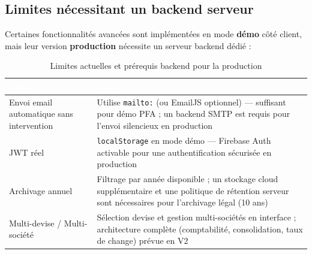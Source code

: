 \documentclass[12pt,a4paper]{report}
\begin{document}
\subsection{Limites nécessitant un backend serveur}

Certaines fonctionnalités avancées sont implémentées en mode \textbf{démo} côté client, mais leur version \textbf{production} nécessite un serveur backend dédié :

\begin{table}[H]
\centering
\caption{Limites actuelles et prérequis backend pour la production}
\label{tab:limites_backend}
\begin{tabularx}{\textwidth}{|l|X|}
\hline
\rowcolor{emsiblue}\textcolor{white}{\textbf{Point}} & \textcolor{white}{\textbf{Note}} \\
\hline
Envoi email automatique sans intervention & Utilise \texttt{mailto:} (ou EmailJS optionnel) — suffisant pour démo PFA ; un backend SMTP est requis pour l'envoi silencieux en production \\
\hline
JWT réel & \texttt{localStorage} en mode démo — Firebase Auth activable pour une authentification sécurisée en production \\
\hline
Archivage annuel & Filtrage par année disponible ; un stockage cloud supplémentaire et une politique de rétention serveur sont nécessaires pour l'archivage légal (10 ans) \\
\hline
Multi-devise / Multi-société & Sélection devise et gestion multi-sociétés en interface ; architecture complète (comptabilité, consolidation, taux de change) prévue en V2 \\
\hline
\end{tabularx}
\end{table}
\end{document}
